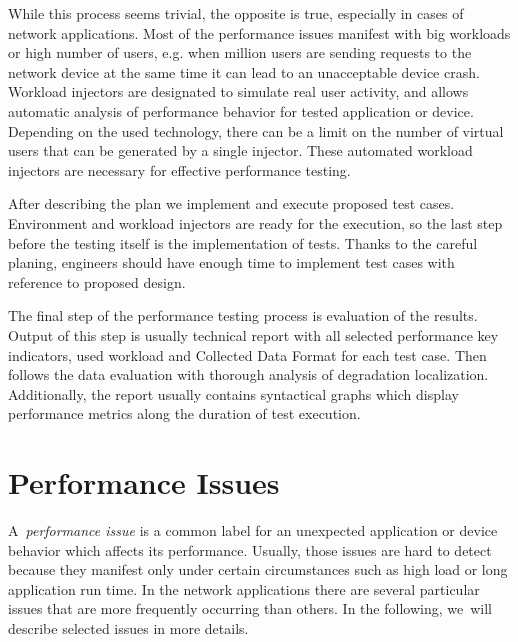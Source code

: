 While this process seems trivial, the opposite is true, especially in cases of network applications. Most of the performance issues manifest with big workloads or high number of users, e.g. when million users are sending requests to the network device at the same time it can lead to an unacceptable device crash. Workload injectors are designated to simulate real user activity, and allows automatic analysis of performance behavior for tested application or device. Depending on the used technology, there can be a limit on the number of virtual users that can be generated by a single injector. These automated workload injectors are necessary for effective performance testing.

After describing the plan we implement and execute proposed test cases. Environment and workload injectors are ready for the execution, so the last step before the testing itself is the implementation of tests. Thanks to the careful planing, engineers should have enough time to implement test cases with reference to proposed design.

The final step of the performance testing process is evaluation of the results. Output of this step is usually technical report with all selected performance key indicators, used workload and Collected Data Format for each test case. Then follows the data evaluation with thorough analysis of degradation localization. Additionally, the report usually contains syntactical graphs which display performance metrics along the duration of test execution.

\section{Performance Issues}
\label{Performance Issues}
A~\emph{performance issue} is a common label for an unexpected application or device behavior which affects its performance. Usually, those issues are hard to detect because they manifest only under certain circumstances such as high load or long application run time. In the network applications there are several particular issues that are more frequently occurring  than others. In the following, we~will describe selected issues in more details.

